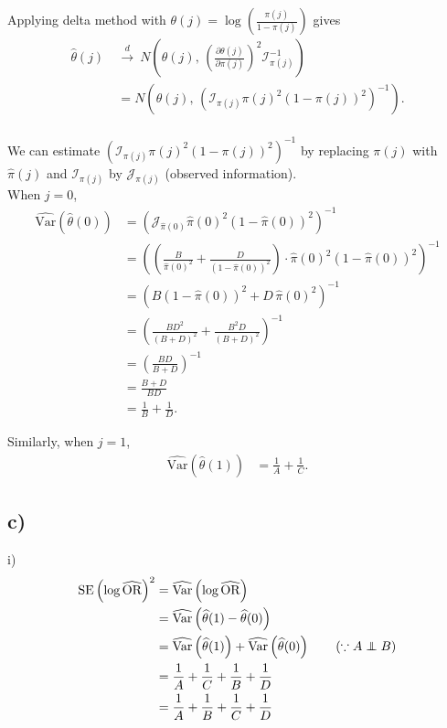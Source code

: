 \documentclass[a4paper]{article}
\newcommand\independent{\protect\mathpalette{\protect\independenT}{\perp}}
\def\independenT#1#2{\mathrel{\rlap{$#1#2$}\mkern2mu{#1#2}}}
\newcommand{\Var}{\mathrm{Var}}
\begin{document}
Applying delta method with $\theta(j) = \log\left(\frac{\pi(j)}{1-\pi(j)}\right)$ gives
\begin{align*}
\widehat{\theta}(j) ~&\overset{d}{\to}~ N\left(\theta(j), \, \left(\frac{\partial \theta(j)}{\partial \pi(j)}\right)^{2} \mathcal{I}_{\pi(j)}^{-1}\right)\\
&= N\left(\theta(j), \, \left(\mathcal{I}_{\pi(j)}\pi(j)^{2}\left(1-\pi(j)\right)^{2}\right)^{-1}\right).\\
\end{align*}

We can estimate $\left(\mathcal{I}_{\pi(j)}\pi(j)^{2}\left(1-\pi(j)\right)^{2}\right)^{-1}$ by replacing $\pi(j)$ with $\widehat{\pi}(j)$ and $\mathcal{I}_{\pi(j)}$ by $\mathcal{J}_{\pi(j)}$ (observed information).\\

When $j = 0$,
\begin{align*}
\widehat{\Var}\left(\widehat{\theta}(0)\right) &= \left(\mathcal{J}_{\widehat{\pi}(0)}\widehat{\pi}(0)^{2}\left(1-\widehat{\pi}(0)\right)^{2}\right)^{-1}\\
&= \left(\left(\frac{B}{\widehat{\pi}(0)^{2}} + \frac{D}{(1-\widehat{\pi}(0))^{2}}\right)\cdot \widehat{\pi}(0)^{2}\left(1-\widehat{\pi}(0)\right)^{2} \right)^{-1}\\
&= \left(B\left(1-\widehat{\pi}(0)\right)^{2} + D \, \widehat{\pi}(0)^{2}\right)^{-1}\\
&= \left(\frac{BD^{2}}{(B+D)^{2}} + \frac{B^{2}D}{(B+D)^{2}}\right)^{-1}\\
&= \left(\frac{BD}{B+D}\right)^{-1}\\
&= \frac{B+D}{BD}\\
&= \frac{1}{B} + \frac{1}{D}.
\end{align*}

Similarly, when $j = 1$,
\begin{align*}
\widehat{\Var}\left(\widehat{\theta}(1)\right) &= \frac{1}{A} + \frac{1}{C}.
\end{align*}

\vspace{\baselineskip}
\subsection{c)}

i)
\begin{align*}
\mathrm{SE}\left(\log\widehat{\mathrm{OR}}\right)^{2} &= \widehat{\Var}\left(\log\widehat{\mathrm{OR}}\right)\\
&= \widehat{\Var}\left(\widehat{\theta}(1) - \widehat{\theta}(0)\right)\\
&= \widehat{\Var}\left(\widehat{\theta}(1)\right) + \widehat{\Var}\left(\widehat{\theta}(0)\right) \tag{$\because A \independent B$}\\
&= \frac{1}{A} + \frac{1}{C} + \frac{1}{B} + \frac{1}{D}\\
&= \frac{1}{A} + \frac{1}{B} + \frac{1}{C} + \frac{1}{D}\\
\end{align*}
\end{document}
